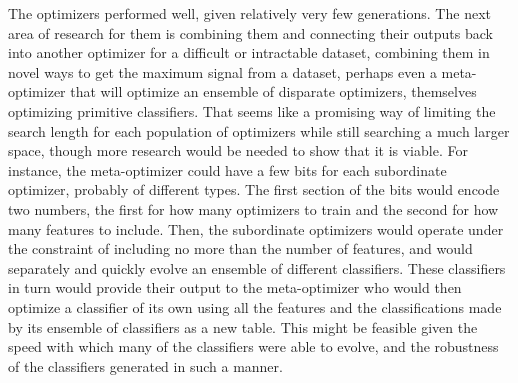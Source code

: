 The optimizers performed well, given relatively very few generations.  The next area of research for them is combining them and connecting their outputs back into another optimizer for a difficult or intractable dataset, combining them in novel ways to get the maximum signal from a dataset, perhaps even a meta-optimizer that will optimize an ensemble of disparate optimizers, themselves optimizing primitive classifiers.  That seems like a promising way of limiting the search length for each population of optimizers while still searching a much larger space, though more research would be needed to show that it is viable.  For instance, the meta-optimizer could have a few bits for each subordinate optimizer, probably of different types.  The first section of the bits would encode two numbers, the first for how many optimizers to train and the second for how many features to include.   Then, the subordinate optimizers would operate under the constraint of including no more than the number of features, and would separately and quickly evolve an ensemble of different classifiers.  These classifiers in turn would provide their output to the meta-optimizer who would then optimize a classifier of its own using all the features and the classifications made by its ensemble of classifiers as a new table.  This might be feasible given the speed with which many of the classifiers were able to evolve, and the robustness of the classifiers generated in such a manner.\\
